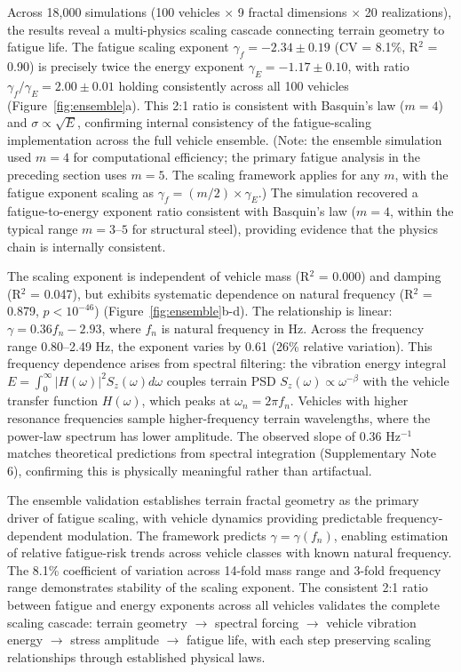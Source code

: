 \documentclass[11pt]{article}
\begin{document}
Across 18,000 simulations (100 vehicles $\times$ 9 fractal dimensions $\times$ 20 realizations), the results reveal a multi-physics scaling cascade connecting terrain geometry to fatigue life. The fatigue scaling exponent $\gamma_f = -2.34 \pm 0.19$ (CV = 8.1\%, R$^2$ = 0.90) is precisely twice the energy exponent $\gamma_E = -1.17 \pm 0.10$, with ratio $\gamma_f / \gamma_E = 2.00 \pm 0.01$ holding consistently across all 100 vehicles (Figure~\ref{fig:ensemble}a). This 2:1 ratio is consistent with Basquin's law ($m = 4$) and $\sigma \propto \sqrt{E}$, confirming internal consistency of the fatigue-scaling implementation across the full vehicle ensemble. (Note: the ensemble simulation used $m = 4$ for computational efficiency; the primary fatigue analysis in the preceding section uses $m = 5$. The scaling framework applies for any $m$, with the fatigue exponent scaling as $\gamma_f = (m/2) \times \gamma_E$.) The simulation recovered a fatigue-to-energy exponent ratio consistent with Basquin's law ($m = 4$, within the typical range $m = 3$--$5$ for structural steel), providing evidence that the physics chain is internally consistent.

The scaling exponent is independent of vehicle mass (R$^2$ = 0.000) and damping (R$^2$ = 0.047), but exhibits systematic dependence on natural frequency (R$^2$ = 0.879, $p < 10^{-46}$) (Figure~\ref{fig:ensemble}b-d). The relationship is linear: $\gamma = 0.36 f_n - 2.93$, where $f_n$ is natural frequency in Hz. Across the frequency range 0.80--2.49 Hz, the exponent varies by 0.61 (26\% relative variation). This frequency dependence arises from spectral filtering: the vibration energy integral $E = \int_0^\infty |H(\omega)|^2 S_z(\omega) d\omega$ couples terrain PSD $S_z(\omega) \propto \omega^{-\beta}$ with the vehicle transfer function $H(\omega)$, which peaks at $\omega_n = 2\pi f_n$. Vehicles with higher resonance frequencies sample higher-frequency terrain wavelengths, where the power-law spectrum has lower amplitude. The observed slope of 0.36 Hz$^{-1}$ matches theoretical predictions from spectral integration (Supplementary Note 6), confirming this is physically meaningful rather than artifactual.

The ensemble validation establishes terrain fractal geometry as the primary driver of fatigue scaling, with vehicle dynamics providing predictable frequency-dependent modulation. The framework predicts $\gamma = \gamma(f_n)$, enabling estimation of relative fatigue-risk trends across vehicle classes with known natural frequency. The 8.1\% coefficient of variation across 14-fold mass range and 3-fold frequency range demonstrates stability of the scaling exponent. The consistent 2:1 ratio between fatigue and energy exponents across all vehicles validates the complete scaling cascade: terrain geometry $\rightarrow$ spectral forcing $\rightarrow$ vehicle vibration energy $\rightarrow$ stress amplitude $\rightarrow$ fatigue life, with each step preserving scaling relationships through established physical laws.
\end{document}
